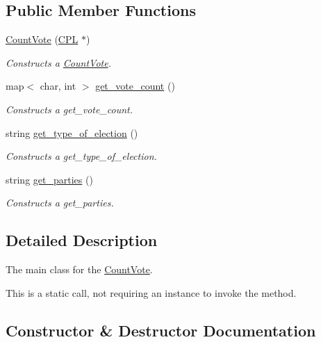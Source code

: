 \subsection*{Public Member Functions}
\begin{DoxyCompactItemize}
\item 
\hyperlink{classCountVote_a3da3982d1f6bceb03909bdabcc6d1c51}{Count\+Vote} (\hyperlink{classCPL}{C\+PL} $\ast$)
\begin{DoxyCompactList}\small\item\em Constructs a \hyperlink{classCountVote}{Count\+Vote}. \end{DoxyCompactList}\item 
map$<$ char, int $>$ \hyperlink{classCountVote_a673eb4f6f6c35ea833ecaef84904acac}{get\+\_\+vote\+\_\+count} ()
\begin{DoxyCompactList}\small\item\em Constructs a get\+\_\+vote\+\_\+count. \end{DoxyCompactList}\item 
string \hyperlink{classCountVote_a6bdd57641102485e77145dd078b38b93}{get\+\_\+type\+\_\+of\+\_\+election} ()
\begin{DoxyCompactList}\small\item\em Constructs a get\+\_\+type\+\_\+of\+\_\+election. \end{DoxyCompactList}\item 
string \hyperlink{classCountVote_a67aee22b5f3dee3c24a0cd49105a9a4c}{get\+\_\+parties} ()
\begin{DoxyCompactList}\small\item\em Constructs a get\+\_\+parties. \end{DoxyCompactList}\end{DoxyCompactItemize}


\subsection{Detailed Description}
The main class for the \hyperlink{classCountVote}{Count\+Vote}. 

This is a static call, not requiring an instance to invoke the method. 

\subsection{Constructor \& Destructor Documentation}
\mbox{\label{classCountVote_a3da3982d1f6bceb03909bdabcc6d1c51}} 
